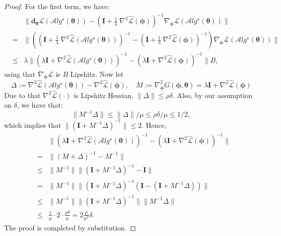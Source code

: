 \documentclass{article} \usepackage[nonatbib, final]{mod_neurips}
\newcommand{\eye}{\boldsymbol{I}}
\newcommand{\param}{{\bm{\phi}}}               \newcommand{\paramspace}{\Phi}
\newcommand{\prior}{{\bm{\theta}}}               \newcommand{\priorspace}{\Theta}
\newcommand{\fn}{\mathcal{L}}                  \newcommand{\udfn}{\tilde{\fn}}        \newcommand{\fnht}{\hat{\fn}}        \newcommand{\ud}{\alg}
\newcommand{\algstar}{\mathcal{A}lg^\star}
\newcommand{\grad}{\bm{d}}
\newcommand{\pgrad}{\nabla}
\begin{document}
\begin{proof}
For the first term, we have:
  \begin{eqnarray*}
&&
\|\grad_\prior \fn(\algstar(\prior))-\left( \eye + \frac{1}{\lambda}~ \pgrad^2 \fnht (\param) \right)^{-1}\pgrad_\param \fn(\algstar(\prior))  \| \\
&= &
\| \left(\left( \eye + \frac{1}{\lambda}~ \pgrad^2 \fnht (\algstar(\prior)) \right)^{-1}
-\left( \eye + \frac{1}{\lambda}~ \pgrad^2 \fnht (\param) \right)^{-1}\right) \pgrad_\param \fn(\algstar(\prior))\| 
\\
&\leq &
\lambda \| \left( \lambda \eye + \pgrad^2 \fnht (\algstar(\prior)) \right)^{-1}
-\left( \lambda \eye + \pgrad^2 \fnht (\param) \right)^{-1}\| B,
  \end{eqnarray*}
using that $\pgrad_\param \fn$ is $B$ Lipshitz.
Now let
\[
\Delta := 
  \pgrad^2 \fnht (\algstar(\prior))-\pgrad^2 \fnht (\param) , \quad
  M:= \nabla^2_\param G(\param,\prior)= \lambda \eye + \pgrad^2 \fnht (\param)
\]
Due to that $\pgrad^2 \fnht (\cdot)$ is Lipshitz Hessian,
$\|\Delta\|\leq \rho \delta$. Also, by our assumption on
$\delta$, we have that:
\[
\|M^{-1}\Delta\| \leq \|\Delta\|/\mu \leq \rho
\delta/\mu \leq 1/2,
 \] 
which implies that $\|\left( \eye + M^{-1}\Delta \right)^{-1}\|\leq 2$.
Hence,
\begin{eqnarray*}
  &&\| \left( \lambda\eye + \pgrad^2 \fnht (\algstar(\prior)) \right)^{-1}
-\left( \lambda \eye + \pgrad^2 \fnht (\param)
     \right)^{-1}     \|\\
  &=&\| \left( M +\Delta \right)^{-1}-M^{-1}\|\\
  &\leq& \|M^{-1}\|\| \left( \eye + M^{-1}\Delta \right)^{-1}-\eye\|\\
  &=& \|M^{-1}\|\| \left( \eye + M^{-1}\Delta \right)^{-1}\left(\eye-\left(\eye + M^{-1}\Delta\right)\right)\|\\
  &\leq& \|M^{-1}\| \| \left( \eye + M^{-1}\Delta \right)^{-1}\| \| M^{-1}\Delta\|\\
  &\leq& \frac{1}{\mu} \cdot 2 \cdot \frac{\rho \delta}{\mu}=2 \frac{\rho}{\mu^2} \delta .
\end{eqnarray*}
The proof is completed by substitution.
\end{proof}
\end{document}
